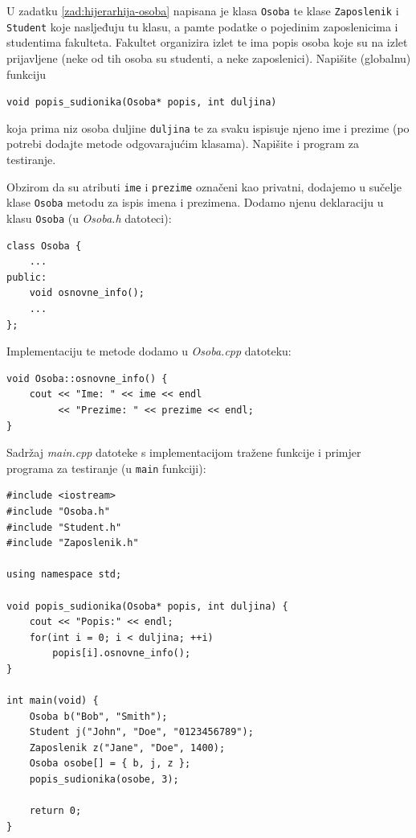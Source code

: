 \begin{zadatak}\label{zad:osoba-zaposlenik-student}
    U zadatku \ref{zad:hijerarhija-osoba} napisana je klasa \texttt{Osoba}
    te klase \texttt{Zaposlenik} i \texttt{Student}
    koje nasljeđuju tu klasu, a pamte podatke o pojedinim
    zaposlenicima i studentima fakulteta.
    Fakultet organizira izlet te ima popis osoba koje su na izlet prijavljene
    (neke od tih osoba su studenti, a neke zaposlenici).
    Napišite (globalnu) funkciju 
    \begin{center}
        \texttt{void popis\_sudionika(Osoba* popis, int duljina)}
    \end{center}
    koja prima niz osoba duljine \texttt{duljina}
    te za svaku ispisuje njeno ime i prezime
    (po potrebi dodajte metode odgovarajućim klasama).
    Napišite i program za testiranje.
\end{zadatak}


\begin{rjesenje}
    Obzirom da su atributi \texttt{ime} i \texttt{prezime}
    označeni kao privatni, dodajemo u sučelje klase \texttt{Osoba} metodu za ispis imena i prezimena.
    Dodamo njenu deklaraciju u klasu \texttt{Osoba}
    (u \textit{Osoba.h} datoteci):
    \begin{verbatim}
class Osoba {
    ...
public:
    void osnovne_info();
    ...
};
    \end{verbatim}
    Implementaciju te metode dodamo u \textit{Osoba.cpp}
    datoteku:
\begin{verbatim}
void Osoba::osnovne_info() {
    cout << "Ime: " << ime << endl
         << "Prezime: " << prezime << endl;
}
\end{verbatim}

    Sadržaj \textit{main.cpp} datoteke s implementacijom
    tražene funkcije i primjer programa za testiranje
    (u \texttt{main} funkciji):
\begin{verbatim}
#include <iostream>
#include "Osoba.h"
#include "Student.h"
#include "Zaposlenik.h"

using namespace std;

void popis_sudionika(Osoba* popis, int duljina) {
    cout << "Popis:" << endl;
    for(int i = 0; i < duljina; ++i)
        popis[i].osnovne_info();
}

int main(void) {
    Osoba b("Bob", "Smith");
    Student j("John", "Doe", "0123456789");
    Zaposlenik z("Jane", "Doe", 1400);
    Osoba osobe[] = { b, j, z };
    popis_sudionika(osobe, 3);
    
    return 0;
}
\end{verbatim}
\end{rjesenje}


